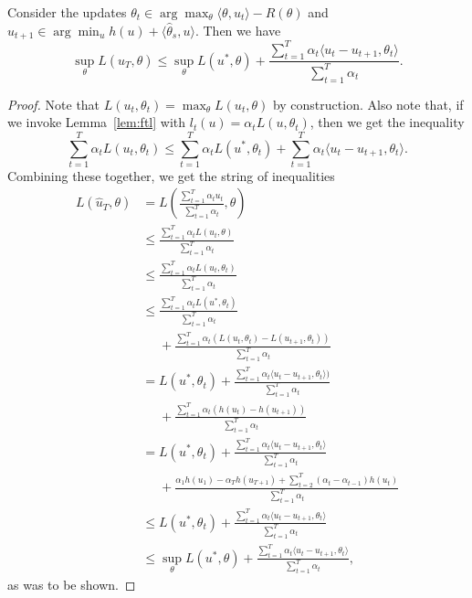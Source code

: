 \documentclass{article}
\begin{document}
\begin{proposition}
\label{prop:method-1}
Consider the updates $\theta_t \in \arg\max_{\theta} \langle \theta, u_t \rangle - R(\theta)$ 
and $u_{t+1} \in \arg\min_u h(u) + \langle \hat{\theta}_s, u \rangle$. 
Then we have
\[ \sup_{\theta} L(\hat{u}_T, \theta) \leq \sup_{\theta} L(u^*, \theta) + \frac{\sum_{t=1}^T \alpha_t \langle u_t - u_{t+1}, \theta_t \rangle}{\sum_{t=1}^T \alpha_t}. \]
\end{proposition}
\begin{proof}
Note that $L(u_t, \theta_t) = \max_{\theta} L(u_t, \theta)$ by construction. Also note that, if we invoke 
Lemma~\ref{lem:ftl} with $l_t(u) = \alpha_t L(u, \theta_t)$, then we get the inequality
\[ \sum_{t=1}^T \alpha_t L(u_t, \theta_t) \leq \sum_{t=1}^T \alpha_t L(u^*, \theta_t) + \sum_{t=1}^T \alpha_t \langle u_t - u_{t+1}, \theta_t \rangle. \]
Combining these together, we get the string of inequalities
\begin{align*}
L(\hat{u}_T, \theta) &= L\left(\frac{\sum_{t=1}^T \alpha_tu_t}{\sum_{t=1}^T \alpha_t}, \theta\right) \\
 &\leq \frac{\sum_{t=1}^T \alpha_t L(u_t, \theta)}{\sum_{t=1}^T \alpha_t} \\
 &\leq \frac{\sum_{t=1}^T \alpha_t L(u_t, \theta_t)}{\sum_{t=1}^T \alpha_t} \\
 &\leq \frac{\sum_{t=1}^T \alpha_tL(u^*, \theta_t)}{\sum_{t=1}^T \alpha_t} \\ &\phantom{=} + \frac{\sum_{t=1}^T \alpha_t (L(u_t,\theta_t)-L(u_{t+1},\theta_t))}{\sum_{t=1}^T \alpha_t} \\
 &= L(u^*, \theta_t) + \frac{\sum_{t=1}^T \alpha_t \langle u_t - u_{t+1}, \theta_t \rangle)}{\sum_{t=1}^T \alpha_t} \\ &\phantom{=} + \frac{\sum_{t=1}^{T} \alpha_t(h(u_t)-h(u_{t+1}))}{\sum_{t=1}^T \alpha_t} \\
 &= L(u^*, \theta_t) + \frac{\sum_{t=1}^T \alpha_t \langle u_t - u_{t+1}, \theta_t \rangle}{\sum_{t=1}^T \alpha_t} \\ &\phantom{=} + \frac{\alpha_1 h(u_1) - \alpha_T h(u_{T+1}) + \sum_{t=2}^{T} (\alpha_t-\alpha_{t-1}) h(u_t)}{\sum_{t=1}^T \alpha_t} \\
 &\leq L(u^*, \theta_t) + \frac{\sum_{t=1}^T \alpha_t \langle u_t - u_{t+1}, \theta_t \rangle}{\sum_{t=1}^T \alpha_t} \\
 &\leq \sup_{\theta} L(u^*, \theta) + \frac{\sum_{t=1}^T \alpha_t \langle u_t - u_{t+1}, \theta_t \rangle}{\sum_{t=1}^T \alpha_t},
\end{align*}
as was to be shown.
\end{proof}
\end{document}
